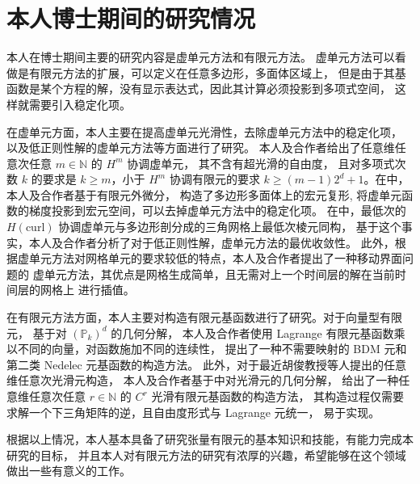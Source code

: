 \documentclass[lang=cn,a4paper,newtx]{elegantpaper}
\begin{document}
\section{本人博士期间的研究情况}

本人在博士期间主要的研究内容是虚单元方法和有限元方法。
虚单元方法可以看做是有限元方法的扩展，可以定义在任意多边形，多面体区域上，
但是由于其基函数是某个方程的解，没有显示表达式，因此其计算必须投影到多项式空间，
这样就需要引入稳定化项。

在虚单元方面，本人主要在提高虚单元光滑性，去除虚单元方法中的稳定化项，
以及低正则性解的虚单元方法等方面进行了研究。
本人及合作者给出了任意维任意次任意 $m\in \mathbb{N}$ 的 $H^m$
协调虚单元\cite{chen2022conforming}， 其不含有超光滑的自由度，
且对多项式次数 $k$ 的要求是
$k\geq m$，小于 $H^m$ 协调有限元的要求
$k\geq (m-1)2^d+1$。在\cite{chen2024virtual}中，本人及合作者基于有限元外微分，
构造了多边形多面体上的宏元复形,
将虚单元函数的梯度投影到宏元空间，可以去掉虚单元方法中的稳定化项。
在\cite{chen2023anisotropic}中，最低次的 $H(\mathrm{curl})$
协调虚单元与多边形剖分成的三角网格上最低次棱元同构，
基于这个事实，本人及合作者分析了对于低正则性解，虚单元方法的最优收敛性。
此外，根据虚单元方法对网格单元的要求较低的特点，本人及合作者提出了一种移动界面问题的
虚单元方法，其优点是网格生成简单，且无需对上一个时间层的解在当前时间层的网格上
进行插值。

在有限元方法方面，本人主要对构造有限元基函数进行了研究。对于向量型有限元，
基于对 $(\mathbb{P}_k)^d$ 的几何分解， 本人及合作者使用 Lagrange
有限元基函数乘以不同的向量，对函数施加不同的连续性，
提出了一种不需要映射的 BDM 元和第二类 Nedelec 元基函数的构造方法。
此外，对于最近胡俊教授等人提出的任意维任意次光滑元构造\cite{hu2023construction}，
本人及合作者基于\cite{chen2021geometric}中对光滑元的几何分解，
给出了一种任意维任意次任意
$r\in \mathbb{N}$ 的 $C^r$ 光滑有限元基函数的构造方法，
其构造过程仅需要求解一个下三角矩阵的逆，且自由度形式与 Lagrange 元统一，
易于实现。

根据以上情况，本人基本具备了研究张量有限元的基本知识和技能，有能力完成本研究的目标，
并且本人对有限元方法的研究有浓厚的兴趣，希望能够在这个领域做出一些有意义的工作。
\end{document}
